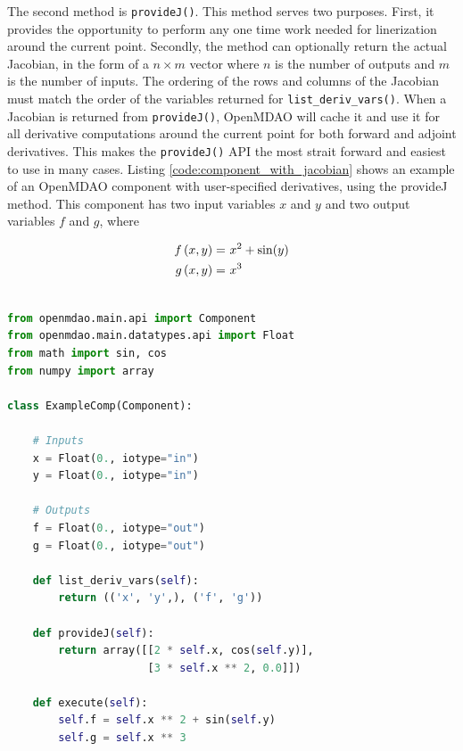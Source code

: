 \documentclass[]{aiaa-tc} %
\begin{document}
        The second method is \texttt{provideJ()}. This method serves two purposes. First, it provides the
        opportunity to perform any one time work needed for linerization around the current point. Secondly,
        the method can optionally return the actual Jacobian, in the form of a $n \times m$ vector where $n$ is the
        number of outputs and $m$ is the number of inputs. The ordering of the rows and columns of the Jacobian
        must match the order of the variables returned for \texttt{list\_deriv\_vars()}. When a Jacobian is
        returned from \texttt{provideJ()}, OpenMDAO will cache it and use it for all derivative computations
        around the current point for both forward and adjoint derivatives. This makes the \texttt{provideJ()}
        API the most strait forward and easiest to use in many cases. Listing \ref{code:component_with_jacobian} shows
        an example of an OpenMDAO component with user-specified derivatives, using the provideJ method.
        This component has two input variables $x$ and $y$ and two output variables $f$ and $g$, where

        \begin{align}
            f\left(x, y\right) =&\  x^2 + \sin(y) \\ \notag
            g\left(x, y\right) =&\  x^3
        \end{align}

\begin{minipage}{\linewidth}
\begin{lstlisting}[label=code:component_with_jacobian,caption=Example OpenMDAO
component with user-specified Jacobian,
language=Python, basicstyle=\ttfamily\scriptsize,
           keywordstyle=\color{blue}\ttfamily,
           stringstyle=\color{red}\ttfamily, showstringspaces=false,
           commentstyle=\color{olive}\ttfamily]

from openmdao.main.api import Component
from openmdao.main.datatypes.api import Float
from math import sin, cos
from numpy import array

class ExampleComp(Component):

    # Inputs
    x = Float(0., iotype="in")
    y = Float(0., iotype="in")

    # Outputs
    f = Float(0., iotype="out")
    g = Float(0., iotype="out")

    def list_deriv_vars(self):
        return (('x', 'y',), ('f', 'g'))

    def provideJ(self):
        return array([[2 * self.x, cos(self.y)],
                      [3 * self.x ** 2, 0.0]])

    def execute(self):
        self.f = self.x ** 2 + sin(self.y)
        self.g = self.x ** 3

\end{lstlisting}
\end{minipage}
\end{document}

